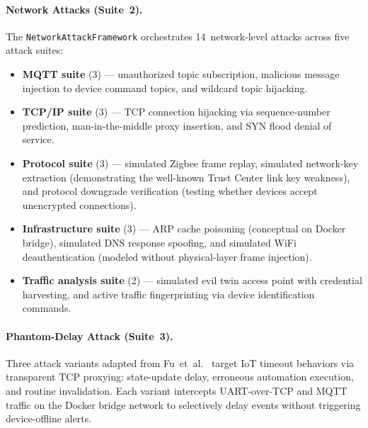 \paragraph{Network Attacks (Suite~2).}
The \texttt{NetworkAttackFramework} orchestrates 14~network-level
attacks across five attack suites:
\begin{itemize}[leftmargin=*]
  \item \textbf{MQTT suite} (3) --- unauthorized topic subscription,
    malicious message injection to device command topics, and
    wildcard topic hijacking.
  \item \textbf{TCP/IP suite} (3) --- TCP connection hijacking via
    sequence-number prediction, man-in-the-middle proxy insertion,
    and SYN flood denial of service.
  \item \textbf{Protocol suite} (3) --- simulated Zigbee frame
    replay, simulated network-key extraction (demonstrating the
    well-known Trust Center link key weakness), and protocol
    downgrade verification (testing whether devices accept
    unencrypted connections).
  \item \textbf{Infrastructure suite} (3) --- ARP cache poisoning
    (conceptual on Docker bridge), simulated DNS response spoofing,
    and simulated WiFi deauthentication (modeled without
    physical-layer frame injection).
  \item \textbf{Traffic analysis suite} (2) --- simulated evil twin
    access point with credential harvesting, and active traffic
    fingerprinting via device identification commands.
\end{itemize}

\paragraph{Phantom-Delay Attack (Suite~3).}
Three attack variants adapted from Fu~et~al.~\cite{phantom-delay}
target IoT timeout behaviors via transparent TCP proxying:
state-update delay, erroneous automation execution, and routine
invalidation.  Each variant intercepts UART-over-TCP and MQTT
traffic on the Docker bridge network to selectively delay events
without triggering device-offline alerts.

